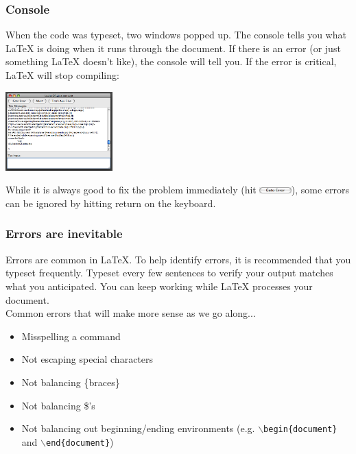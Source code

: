 \documentclass[slidestop,compress,mathserif]{beamer}
\begin{document}
\begin{frame} \frametitle{Console}
When the code was typeset, two windows popped up. The {\color{highlight}console} tells you what LaTeX is doing when it runs through the document. If there is an error (or just something LaTeX doesn't like), the console will tell you. If the error is critical, LaTeX will stop compiling:
\begin{center}
\includegraphics[height=1.2in]{basicsOfLatex/gettingStarted/consoleFail}
\end{center}
While it is always good to fix the problem immediately (hit \includegraphics[height=0.25cm]{basicsOfLatex/gettingStarted/gotoError}), some errors can be ignored by hitting {\color{highlight}return} on the keyboard.
\end{frame}

\begin{frame} \frametitle{Errors are inevitable}
Errors are common in LaTeX. To help identify errors, it is recommended that you typeset frequently. Typeset every few sentences to verify your output matches what you anticipated. You can keep working while LaTeX processes your document. \\
\vspace{0.7cm}
Common errors that will make more sense as we go along...
\begin{itemize}
\item Misspelling a command
\item Not escaping special characters
\item Not balancing {\color{braces}\{}braces{\color{braces}\}}
\item Not balancing {\color{braces}\$}'s
\item Not balancing out beginning/ending environments (e.g. \texttt{\color{command}$\backslash$begin\color{braces}\{\color{black}document\color{braces}\}} and \texttt{\color{command}$\backslash$end\color{braces}\{\color{black}document\color{braces}\}})
\end{itemize}
\end{frame}
\end{document}

